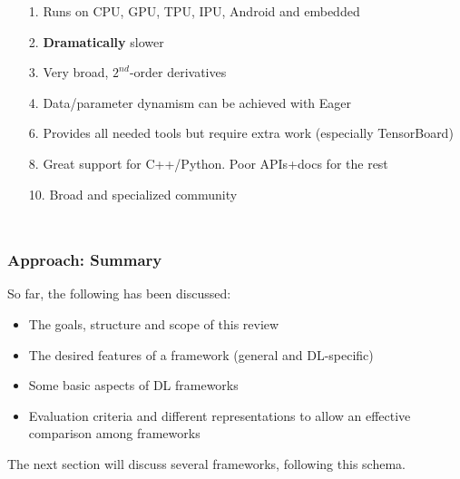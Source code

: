 \documentclass[hyperref={pdfpagelabels=false}]{beamer}
\begin{document}
\begin{frame}
\begin{columns}[t]
\begin{tikzpicture}
         \end{tikzpicture}
         \begin{itemize}
         \item[\scriptsize{\textcolor{visiblered}{1.}}] \scriptsize{Runs on CPU, GPU, TPU, IPU, Android and embedded}
         \item[\scriptsize{\textcolor{visiblered}{2.}}] \scriptsize{\textbf{Dramatically} slower\cite{benchmark-paper17}\cite{u39kun-benchmark}\cite{chainer-benchmarks}}
         \item[\scriptsize{\textcolor{visiblegreen}{3.}}] \scriptsize{Very broad, $2^{nd}$-order derivatives}
         \item[\scriptsize{\textcolor{visiblegreen}{4.}}] \scriptsize{Data/parameter dynamism can be achieved with Eager\cite{tf-eager}}
         \item[\scriptsize{\textcolor{visiblegreen}{6.}}] \scriptsize{Provides all needed tools but require extra work (especially TensorBoard)}
         \item[\scriptsize{\textcolor{visibleblue}{8.}}] \scriptsize{Great support for C++/Python. Poor APIs+docs for the rest}
         \item[\scriptsize{\textcolor{visibleblue}{10.}}] \scriptsize{Broad and specialized community}
         \end{itemize}
       \end{columns}
     \end{frame}


\begin{frame}
  \frametitle{Approach: Summary}
  So far, the following has been discussed:
  \vspace{5mm}
  \begin{itemize}[<.->]
  \item The goals, structure and scope of this review\\[10pt]
  \item The desired features of a framework (general and DL-specific)\\[10pt]
  \item Some basic aspects of DL frameworks\\[10pt]
  \item Evaluation criteria and different representations to allow an effective comparison among frameworks
  \end{itemize}
  \vspace{5mm}
  The next section will discuss several frameworks, following this schema.
\end{frame}
\end{document}

